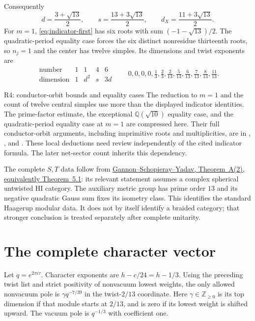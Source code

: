 Consequently
\begin{equation}
 d=\frac{3+\sqrt{13}}2,\qquad
 s=\frac{13+3\sqrt{13}}2,\qquad
 d_X=\frac{11+3\sqrt{13}}2.
 \label{eq:haagerup-dimensions}
\end{equation}
For $m=1$, \eqref{eq:indicator-first} has six roots with sum
$(-1-\sqrt{13})/2$. The quadratic-period equality case forces the
six distinct nonresidue thirteenth roots, so $n_j=1$ and the center
has twelve simples. Its dimensions and twist exponents are
\[
 \begin{array}{c|cccc}
 \text{number}&1&1&4&6\\\hline
 \text{dimension}&1&d^2&s&3d
 \end{array}
 \qquad
 0,0,0,0,\tfrac13,\tfrac23,
 \tfrac2{13},\tfrac5{13},\tfrac6{13},
 \tfrac7{13},\tfrac8{13},\tfrac{11}{13}.
\]
\begin{reviewnote}{R4: conductor-orbit bounds and equality cases}
The reduction to $m=1$ and the count of twelve central simples use more
than the displayed indicator identities. The prime-factor estimate,
the exceptional $\mathbb Q(\sqrt{10})$ equality case, and the
quadratic-period equality case at $m=1$ are compressed here. Their full
conductor-orbit arguments, including imprimitive roots and multiplicities,
are in
,
, and
.
These local deductions need review independently of the cited indicator
formula. The later net-sector count inherits this dependency.
\end{reviewnote}
The complete $S,T$ data follow from
\href{https://arxiv.org/html/2609.25185v1}{Gannon--Schopieray--Yadav,
Theorem~A(2), equivalently Theorem~5.1}: its relevant statement assumes
a complex spherical untwisted HI category. The auxiliary metric group
has prime order $13$ and its negative quadratic Gauss sum fixes its
isometry class. This identifies the standard Haagerup modular data.
It does not by itself identify a braided category; that stronger
conclusion is treated separately after complete unitarity.

\section{The complete character vector}
\label{sec:characters}

Let $q=e^{2\pi i\tau}$. Character exponents are $h-c/24=h-1/3$.
Using the preceding twist list and strict positivity of nonvacuum
lowest weights, the only allowed nonvacuum pole is
$\gamma q^{-7/39}$ in the twist-$2/13$ coordinate. Here
$\gamma\in\mathbb Z_{\ge0}$ is its top dimension if that module starts
at $2/13$, and is zero if its lowest weight is shifted upward. The
vacuum pole is $q^{-1/3}$ with coefficient one.

